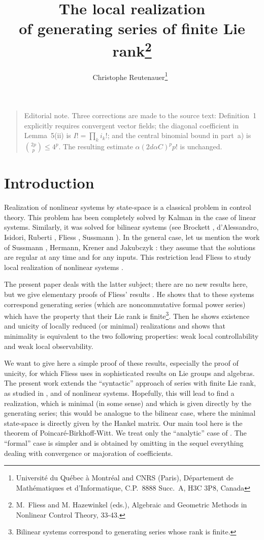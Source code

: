 \documentclass[a4paper,12pt]{article}
\title{The local realization\\of generating series of finite Lie rank\footnote{M.\ Fliess and M. Hazewinkel (eds.), Algebraic and Geometric Methods in Nonlinear Control Theory, 33-43.}}
\author{Christophe Reutenauer\texorpdfstring{\thanks{Université du Québec à Montréal and CNRS (Paris), Département de Mathématiques et d'Informatique, C.P.\ 8888 Succ.\ A, H3C 3P8, Canada}~}{}}
\date{}
\begin{document}
\maketitle

\begin{quote}\small
Editorial note. Three corrections are made to the source text: Definition~1
explicitly requires convergent vector fields; the diagonal coefficient in
Lemma~5(ii) is $I!=\prod_k i_k!$; and the central binomial bound in
part~a) is $\binom{2p}{p}\leq 4^p$. The resulting estimate
$\alpha(2d\alpha C)^p p!$ is unchanged.
\end{quote}

\section{Introduction}

Realization of nonlinear systems by state-space is a classical problem in control theory. This problem has been completely solved by Kalman \cite{10} in the case of linear systems. Similarly, it was solved for bilinear systems (see Brockett \cite{2}, d'Alessandro, Isidori, Ruberti \cite{1}, Fliess \cite{3}, Sussmann \cite{12}). In the general case, let us mention the work of Sussmann \cite{13}, Hermann, Krener \cite{7} and Jakubczyk \cite{9}: they assume that the solutions are regular at any time and for any inputs. This restriction lead Fliess to study local realization of nonlinear systems \cite{5}.

The present paper deals with the latter subject; there are no new results here, but we give elementary proofs of Fliess' results \cite{5}. He shows that to these systems correspond generating series (which are noncommutative formal power series) which have the property that their Lie rank is finite\footnote{Bilinear systems correspond to generating series whose rank is finite.}. Then he shows existence and unicity of locally reduced (or minimal) realizations and shows that minimality is equivalent to the two following properties: weak local controllability and weak local observability.

We want to give here a simple proof of these results, especially the proof of unicity, for which Fliess uses in \cite{5} sophisticated results on Lie groups and algebras. The present work extends the ``syntactic'' approach of series with finite Lie rank, as studied in \cite{5}, and of nonlinear systems. Hopefully, this will lead to find a realization, which is minimal (in some sense) and which is given directly by the generating series; this would be analogue to the bilinear case, where the minimal state-space is directly given by the Hankel matrix.
Our main tool here is the theorem of Poincaré-Birkhoff-Witt. We treat only the ``analytic'' case of \cite{5}. The ``formal'' case is simpler and is obtained by omitting in the sequel everything dealing with convergence or majoration of coefficients.
\end{document}
